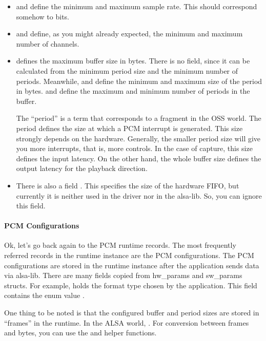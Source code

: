 \documentclass[a4paper,8pt,english]{sphinxmanual}
\begin{document}
\begin{itemize}
\item {} 
 and  define the minimum and maximum sample
rate. This should correspond somehow to  bits.

\item {} 
 and  define, as you might already
expected, the minimum and maximum number of channels.

\item {} 
 defines the maximum buffer size in
bytes. There is no  field, since it can be
calculated from the minimum period size and the minimum number of
periods. Meanwhile,  and define the minimum and
maximum size of the period in bytes.  and
 define the maximum and minimum number of periods in
the buffer.

The “period” is a term that corresponds to a fragment in the OSS
world. The period defines the size at which a PCM interrupt is
generated. This size strongly depends on the hardware. Generally,
the smaller period size will give you more interrupts, that is,
more controls. In the case of capture, this size defines the input
latency. On the other hand, the whole buffer size defines the
output latency for the playback direction.

\item {} 
There is also a field . This specifies the size of the
hardware FIFO, but currently it is neither used in the driver nor
in the alsa-lib. So, you can ignore this field.

\end{itemize}


\paragraph{PCM Configurations}
\label{sound/kernel-api/writing-an-alsa-driver:pcm-configurations}
Ok, let's go back again to the PCM runtime records. The most
frequently referred records in the runtime instance are the PCM
configurations. The PCM configurations are stored in the runtime
instance after the application sends  data via
alsa-lib. There are many fields copied from hw\_params and sw\_params
structs. For example,  holds the format type chosen by the
application. This field contains the enum value
.

One thing to be noted is that the configured buffer and period sizes
are stored in “frames” in the runtime. In the ALSA world, . For conversion between frames and bytes,
you can use the  and
 helper functions.
\end{document}
